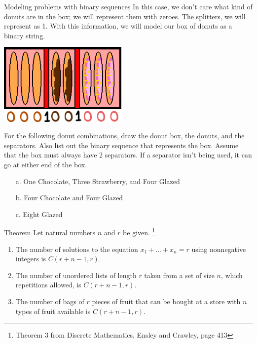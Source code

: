 {\begin{intro}{Modeling problems with binary sequences}
        In this case, we don't care what kind of donuts are in the box;
        we will represent them with zeroes. The splitters, we will represent as 1.
        With this information, we will model our box of donuts as a binary string.

        \begin{center}
            \includegraphics[height=4cm]{images/donutbox3.png}
        \end{center}
    \end{intro}
    
    \begin{questionNOGRADE}{\thequestion}
        For the following donut combinations, draw the donut box, the donuts, and the separators.
        Also list out the binary sequence that represents the box.
        Assume that the box must always have 2 separators. If a separator isn't being used, it can
        go at either end of the box.

        \begin{enumerate}
            \item[a.]   One Chocolate, Three Strawberry, and Four Glazed
            \item[b.]   Four Chocolate and Four Glazed
            \item[c.]   Eight Glazed
        \end{enumerate}
    \end{questionNOGRADE}

    \newpage

    \begin{intro}{Theorem}
        Let natural numbers $n$ and $r$ be given.
        \footnote{Theorem 3 from Discrete Mathematics, Ensley and Crawley, page 413}

        \begin{enumerate}
            \item   The number of solutions to the equation $x_{1} + ... + x_{n} = r$
            using nonnegative integers is $C(r + n - 1, r)$.
            \item   The number of unordered lists of length $r$ taken from a set of size $n$,
            which repetitions allowed, is $C(r + n - 1, r)$.
            \item   The number of bags of $r$ pieces of fruit that can be bought at a store with $n$
            types of fruit available is $C(r + n - 1, r)$.
        \end{enumerate}
    \end{intro}
    
}
